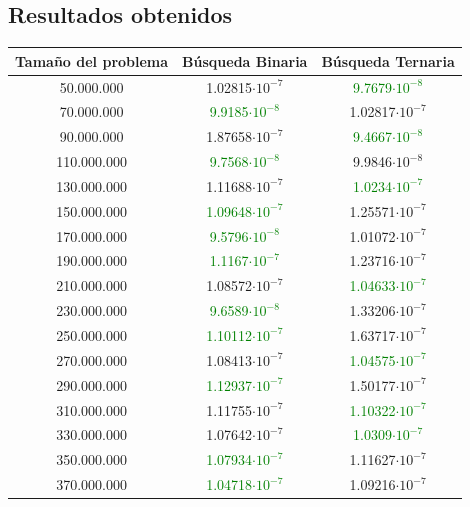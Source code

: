 \documentclass[12pt,spanish]{article}
\begin{document}
\subsection{Resultados obtenidos}
\begin{table}[H]
\centering
\begin{tabular}{|c|c|c|}
\hline
\textbf{Tamaño del problema} & \textbf{Búsqueda Binaria} & \textbf{Búsqueda Ternaria}\\
\hline
50.000.000 & 1.02815$\cdot 10^{-7}$ & \textcolor{green}{9.7679$\cdot 10^{-8}$}\\
\hline
70.000.000 & \textcolor{green}{9.9185$\cdot 10^{-8}$} & 1.02817$\cdot 10^{-7}$\\
\hline
90.000.000 & 1.87658$\cdot 10^{-7}$ & \textcolor{green}{9.4667$\cdot 10^{-8}$}\\
\hline
110.000.000 & \textcolor{green}{9.7568$\cdot 10^{-8}$} & 9.9846$\cdot 10^{-8}$\\
\hline
130.000.000 & 1.11688$\cdot 10^{-7}$ & \textcolor{green}{1.0234$\cdot 10^{-7}$}\\
\hline
150.000.000 & \textcolor{green}{1.09648$\cdot 10^{-7}$} & 1.25571$\cdot 10^{-7}$\\
\hline
170.000.000 & \textcolor{green}{9.5796$\cdot 10^{-8}$} & 1.01072$\cdot 10^{-7}$\\
\hline
190.000.000 & \textcolor{green}{1.1167$\cdot 10^{-7}$} & 1.23716$\cdot 10^{-7}$\\
\hline
210.000.000 & 1.08572$\cdot 10^{-7}$ & \textcolor{green}{1.04633$\cdot 10^{-7}$}\\
\hline
230.000.000 & \textcolor{green}{9.6589$\cdot 10^{-8}$} & 1.33206$\cdot 10^{-7}$\\
\hline
250.000.000 & \textcolor{green}{1.10112$\cdot 10^{-7}$} & 1.63717$\cdot 10^{-7}$\\
\hline
270.000.000 & 1.08413$\cdot 10^{-7}$ & \textcolor{green}{1.04575$\cdot 10^{-7}$}\\
\hline
290.000.000 & \textcolor{green}{1.12937$\cdot 10^{-7}$} & 1.50177$\cdot 10^{-7}$\\
\hline
310.000.000 & 1.11755$\cdot 10^{-7}$ & \textcolor{green}{1.10322$\cdot 10^{-7}$}\\
\hline
330.000.000 & 1.07642$\cdot 10^{-7}$ & \textcolor{green}{1.0309$\cdot 10^{-7}$}\\
\hline
350.000.000 & \textcolor{green}{1.07934$\cdot 10^{-7}$} & 1.11627$\cdot 10^{-7}$\\
\hline
370.000.000 & \textcolor{green}{1.04718$\cdot 10^{-7}$} & 1.09216$\cdot 10^{-7}$\\

\end{tabular}
\end{table}
\end{document}

